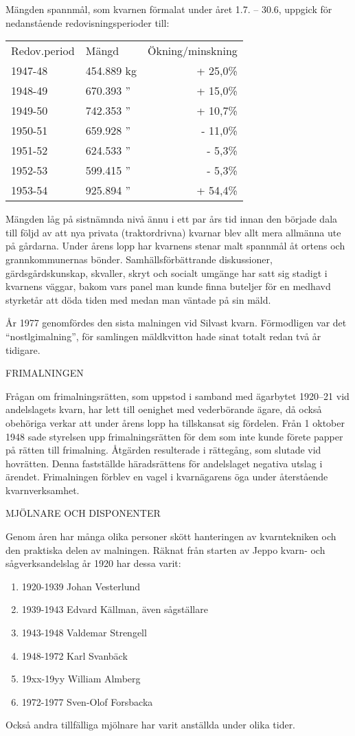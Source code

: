 Mängden spannmål, som kvarnen förmalat under året 1.7. – 30.6, uppgick för nedanstående redovisningsperioder till:
\begin{center}
  \begin{tabular}{l l r}
    \hline
    Redov.period & Mängd & Ökning/minskning \\
    1947-48	&	454.889 kg & + 25,0\% \\
    1948-49	&	670.393 '' & + 15,0\% \\
    1949-50	&	742.353 '' & + 10,7\% \\
    1950-51	&	659.928 '' & - 11,0\% \\
    1951-52	&	624.533 '' & -  5,3\% \\
    1952-53	&	599.415 '' & -  5,3\% \\
    1953-54	&	925.894 '' & + 54,4\% \\
    \hline
  \end{tabular}
\end{center}
Mängden låg på sistnämnda nivå ännu i ett par års tid innan den började dala till följd av att nya privata (traktordrivna) kvarnar blev allt mera allmänna ute på gårdarna. Under årens lopp har kvarnens stenar malt spannmål åt ortens och grannkommunernas bönder. Samhällsförbättrande diskussioner, gärdsgårdskunskap, skvaller, skryt och socialt umgänge har satt sig stadigt i kvarnens väggar, bakom vars panel man kunde finna buteljer för en medhavd styrketår att döda tiden med medan man väntade på sin mäld.

År 1977 genomfördes den sista malningen vid Silvast kvarn. Förmodligen var det ``nostlgimalning'', för samlingen mäldkvitton hade sinat totalt redan två år tidigare.


FRIMALNINGEN

Frågan om frimalningsrätten, som uppstod i samband med ägarbytet 1920--21 vid andelslagets kvarn, har lett till oenighet med vederbörande ägare, då också obehöriga verkar att under årens lopp ha tillskansat sig fördelen. Från 1 oktober 1948 sade styrelsen upp frimalningsrätten för dem som inte kunde förete papper på rätten till frimalning. Åtgärden resulterade i rättegång, som slutade vid hovrätten. Denna fastställde häradsrättens för andelslaget negativa utslag i ärendet. Frimalningen förblev en vagel i kvarnägarens öga under återstående kvarnverksamhet.


MJÖLNARE OCH DISPONENTER

Genom åren har många olika personer skött hanteringen av kvarntekniken och den praktiska delen av malningen. Räknat från starten av Jeppo kvarn- och sågverksandelslag år 1920 har dessa varit:
\begin{enumerate}
  \item 1920-1939		Johan Vesterlund
  \item 1939-1943		Edvard Källman, även sågställare
  \item 1943-1948		Valdemar Strengell
  \item 1948-1972		Karl Svanbäck
  \item 19xx-19yy   William Almberg
  \item 1972-1977		Sven-Olof Forsbacka
\end{enumerate}
Också andra tillfälliga mjölnare har varit anställda under olika tider.

